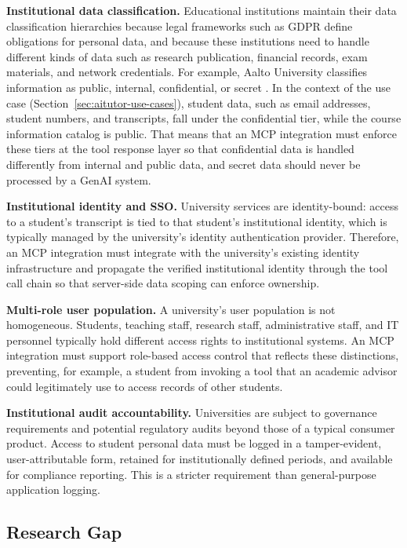 \documentclass[english, 12pt, a4paper, elec, utf8, a-2b, online]{aaltothesis}
\newcommand{\aitutor}{\text{AI Tutor}\xspace}
\begin{document}
\textbf{Institutional data classification.}
Educational institutions maintain their data classification hierarchies because legal frameworks such as GDPR define obligations for personal data, and because these institutions need to handle different kinds of data such as research publication, financial records, exam materials, and network credentials.
For example, Aalto University classifies information as public, internal, confidential, or secret \cite{aalto_classification_info}.
In the context of the \aitutor use case (Section~\ref{sec:aitutor-use-cases}), student data, such as
email addresses, student numbers, and transcripts, fall under the confidential tier, while the course information
catalog is public.
That means that an MCP integration must enforce these tiers at the tool response layer so that confidential data is
handled differently from internal and public data, and secret data should never be processed by a GenAI system.

\textbf{Institutional identity and SSO.}
University services are identity-bound: access to a student's transcript is tied to that student's institutional identity, which is typically managed by the university's identity authentication provider.
Therefore, an MCP integration must integrate with the university's existing identity infrastructure and propagate the verified institutional identity through the tool call chain so that server-side data scoping can enforce ownership.

\textbf{Multi-role user population.}
A university's user population is not homogeneous.
Students, teaching staff, research staff, administrative staff, and IT personnel typically hold different access rights to institutional systems.
An MCP integration must support role-based access control that reflects these distinctions, preventing,
for example, a student from invoking a tool that an academic advisor could legitimately use to access records of other students. 

\textbf{Institutional audit accountability.}
Universities are subject to governance requirements and potential regulatory audits beyond those of a typical consumer product.
Access to student personal data must be logged in a tamper-evident, user-attributable form, retained for institutionally defined periods, and available for compliance reporting.
This is a stricter requirement than general-purpose application logging.

\subsection{Research Gap}
\label{sec:research-gap}
\end{document}
